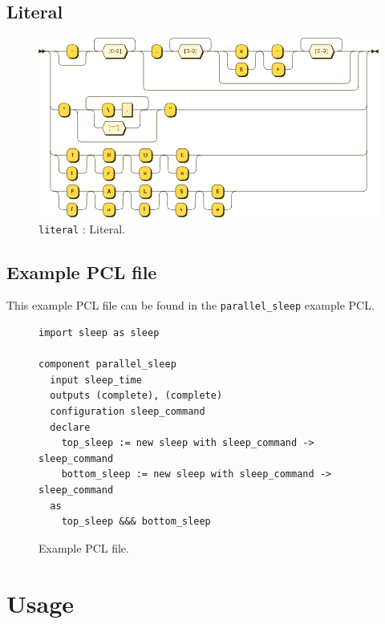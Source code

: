 \subsection{Literal}\label{sec:literals}
\begin{figure}[!h]
  \centering
    \includegraphics[scale=\DiagramScale,angle=90]{chapters/compiler/diagrams/literal}
  \caption{\texttt{literal} : Literal.}
  \label{fig:pcl-literal}
\end{figure}

\subsection{Example PCL file}
This example PCL file can be found in the \texttt{parallel\_sleep} example PCL.
\begin{figure}[!h]
  \begin{verbatim}
import sleep as sleep

component parallel_sleep
  input sleep_time
  outputs (complete), (complete)
  configuration sleep_command
  declare
    top_sleep := new sleep with sleep_command -> sleep_command
    bottom_sleep := new sleep with sleep_command -> sleep_command
  as
    top_sleep &&& bottom_sleep
  \end{verbatim}
  \caption{Example PCL file.}
\end{figure}

\section{Usage}
